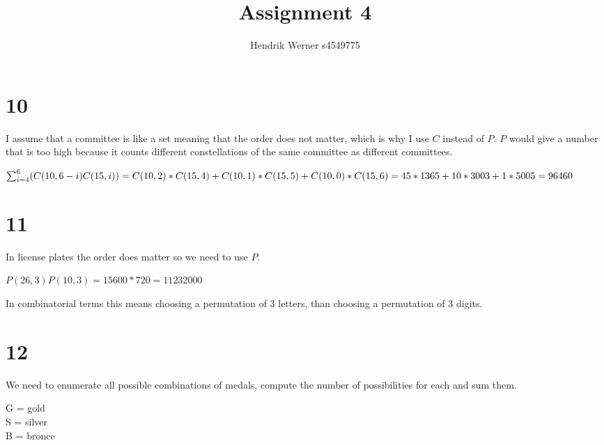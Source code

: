 \documentclass[12pt]{article}
\title {Assignment 4}
\author {Hendrik Werner s4549775}
\begin{document}
\maketitle

\section*{10}
I assume that a committee is like a set meaning that the order does not matter, which is why I use $C$ instead of $P$. $P$ would give a number that is too high because it counts different constellations of the same committee as different committees.

$\sum_{i = 4}^{6}(C(10, 6 - i)C(15, i))\\
= C(10, 2) * C(15, 4) + C(10, 1) * C(15, 5) + C(10, 0) * C(15, 6)\\
= 45 * 1365 + 10 * 3003 + 1 * 5005 = 96460$

\section*{11}
In license plates the order does matter so we need to use $P$.

$P(26, 3)P(10, 3) = 15 600 * 720 = 11 232 000$

In combinatorial terms this means choosing a permutation of 3 letters, than choosing a permutation of 3 digits.

\section*{12}
We need to enumerate all possible combinations of medals, compute the number of possibilities for each and sum them.

G = gold\\
S = silver\\
B = bronce
\end{document}
